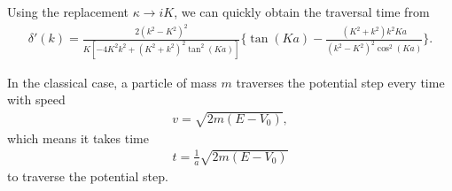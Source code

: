 {Using the replacement $\kappa \rightarrow i K$, we can quickly obtain the traversal time from
\begin{eqnarray}
    \delta'(k) = \frac{2(k^2 - K^2)^2}{K[-4K^2k^2 + (K^2 + k^2)^2 \tan^2(K a)]} \Bigg\{ \tan(Ka) - \frac{(K^2 + k^2) k^2 Ka}{(k^2 - K^2)^2 \cos^2(Ka)} \Bigg\}
.\end{eqnarray}


In the classical case, a particle of mass $m$ traverses the potential step every time with speed
\begin{eqnarray}
    v = \sqrt{2m(E - V_0)}
,\end{eqnarray}
which means it takes time
\begin{eqnarray}
   t = \frac{1}{a}\sqrt{2m(E - V_0)}
\end{eqnarray}
to traverse the potential step.

}


